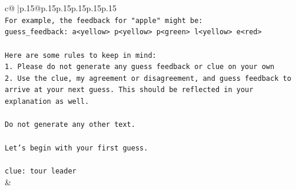 \documentclass{article}
\begin{document}
{\begin{supertabular}{c@{$\;$}|p{.15\linewidth}@{}p{.15\linewidth}p{.15\linewidth}p{.15\linewidth}p{.15\linewidth}p{.15\linewidth}}
{{{\\ 
\texttt{For example, the feedback for "apple" might be:} \\
\texttt{guess\_feedback: a<yellow> p<yellow> p<green> l<yellow> e<red>} \\
\\ 
\texttt{Here are some rules to keep in mind:} \\
\texttt{1. Please do not generate any guess feedback or clue on your own} \\
\texttt{2. Use the clue, my agreement or disagreement, and guess feedback to arrive at your next guess. This should be reflected in your explanation as well.} \\
\\ 
\texttt{Do not generate any other text.} \\
\\ 
\texttt{Let's begin with your first guess.} \\
\\ 
\texttt{clue: tour leader} \\
            }
        }
    }
    & \\ \\


\end{supertabular}}
\end{document}

